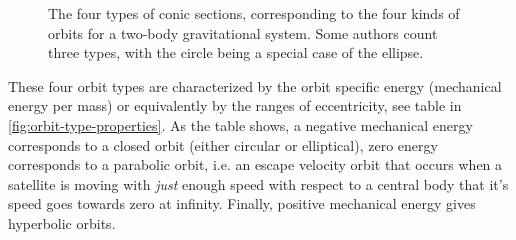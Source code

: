 \begin{figure}[ht]
    \centering
    \hfill
    \caption{The four types of conic sections, corresponding to the four kinds of orbits for a two-body gravitational system. Some authors count three types, with the circle being a special case of the ellipse.}
    \label{fig:conics-and-orbits}
\end{figure}

These four orbit types are characterized by the orbit specific energy (mechanical energy per mass) or equivalently by the ranges of eccentricity, see table in \cref{fig:orbit-type-properties}. As the table shows, a negative mechanical energy corresponds to a closed orbit (either circular or elliptical), zero energy corresponds to a parabolic orbit, i.e. an escape velocity orbit that occurs when a satellite is moving with \emph{just} enough speed with respect to a central body that it's speed goes towards zero at infinity. Finally, positive mechanical energy gives hyperbolic orbits.

